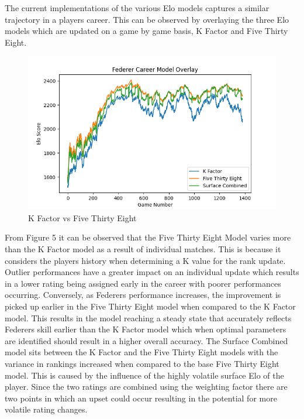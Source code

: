 \documentclass[12pt,a4paper]{article}
\begin{document}
The current implementations of the various Elo models captures a similar trajectory in a
players career. This can be observed by overlaying the three Elo models which are updated
on a game by game basis, K Factor and Five Thirty Eight.
\begin{figure}[H]
  \includegraphics[scale=0.8]{images/federer_career.png}
  \caption{K Factor vs Five Thirty Eight}
  \label{fig:federer-k-538}
\end{figure}

From Figure 5 it can be observed that the Five Thirty Eight Model varies more than the
K Factor model as a result of individual matches. This is because it considers the players
history when determining a K value for the rank update. Outlier performances have a greater
impact on an individual update which results in a lower rating being assigned early in the
career with poorer performances occurring. Conversely, as Federers performance increases,
the improvement is picked up earlier in the Five Thirty Eight model when compared to the
K Factor model. This results in the model reaching a steady state that accurately reflects
Federers skill earlier than the K Factor model which when optimal parameters are identified
should result in a higher overall accuracy. The Surface Combined model sits between the
K Factor and the Five Thirty Eight models with the variance in rankings increased when compared
to the base Five Thirty Eight model. This is caused by the influence of the highly volatile
surface Elo of the player. Since the two ratings are combined using the weighting factor there
are two points in which an upset could occur resulting in the potential for more volatile
rating changes.

\vspace{10mm}
\noindent \hrulefill
\end{document}
